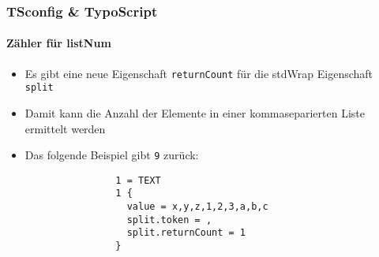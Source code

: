 \begin{frame}[fragile]
	\frametitle{TSconfig \& TypoScript}
	\framesubtitle{Zähler für listNum}

	\lstset{basicstyle=\tiny\ttfamily}

	\begin{itemize}

		\item Es gibt eine neue Eigenschaft \texttt{returnCount} für die stdWrap Eigenschaft \texttt{split}

		\item Damit kann die Anzahl der Elemente in einer kommaseparierten Liste ermittelt werden

		\item Das folgende Beispiel gibt \texttt{9} zurück:

			\begin{lstlisting}
				1 = TEXT
				1 {
				  value = x,y,z,1,2,3,a,b,c
				  split.token = ,
				  split.returnCount = 1
				}
			\end{lstlisting}

	\end{itemize}

\end{frame}


